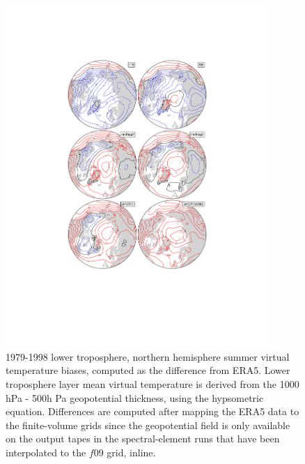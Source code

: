 \documentclass[draft]{agujournal2019}
\begin{document}
\begin{figure}[t]
\begin{center}
         \includegraphics[width=100mm]{figs/temp_contours_diffERA5_Thyps.pdf}
\end{center}
\caption{1979-1998 lower troposphere, northern hemisphere summer virtual temperature biases, computed as the difference from ERA5. Lower troposphere layer mean virtual temperature is derived from the 1000 hPa - 500h Pa geopotential thickness, using the hypsometric equation. Differences are computed after mapping the ERA5 data to the finite-volume grids since the geopotential field is only available on the output tapes in the spectral-element runs that have been interpolated to the $f09$ grid, inline.}
\label{fig:dThyps}
\end{figure}
\end{document}
